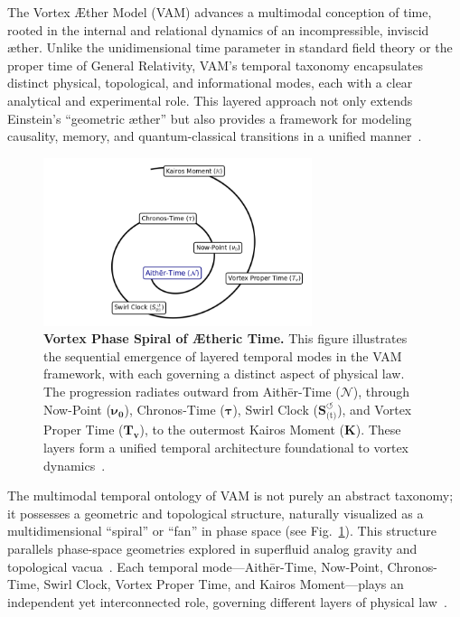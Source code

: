 The Vortex Æther Model (VAM) advances a multimodal conception of time, rooted in the internal and relational dynamics of an incompressible, inviscid æther. Unlike the unidimensional time parameter in standard field theory or the proper time of General Relativity, VAM’s temporal taxonomy encapsulates distinct physical, topological, and informational modes, each with a clear analytical and experimental role. This layered approach not only extends Einstein’s “geometric æther” but also provides a framework for modeling causality, memory, and quantum-classical transitions in a unified manner~\cite{VAM-8, VAM-13, VAM-15}.

\begin{figure}[htb]
    \centering
    \includegraphics[width=0.7\textwidth]{figures/TemporalOntology}
    \caption{
        \textbf{Vortex Phase Spiral of Ætheric Time.} This figure illustrates the sequential emergence of layered temporal modes in the VAM framework, with each governing a distinct aspect of physical law. The progression radiates outward from Aithēr-Time ($\boldsymbol{\mathcal{N}}$), through Now-Point ($\boldsymbol{\nu_0}$), Chronos-Time ($\boldsymbol{\tau}$), Swirl Clock ($\boldsymbol{S}^{\boldsymbol{\circlearrowleft}}_\text{(t)}$), and Vortex Proper Time ($\boldsymbol{T_v}$), to the outermost Kairos Moment ($\mathbb{\boldsymbol{K}}$). These layers form a unified temporal architecture foundational to vortex dynamics~\cite{VAM-8, VAM-13}.
    }

    \label{fig:temporal_ontology}
\end{figure}

The multimodal temporal ontology of VAM is not purely an abstract taxonomy; it possesses a geometric and topological structure, naturally visualized as a multidimensional “spiral” or “fan” in phase space (see Fig.~\ref{fig:temporal_ontology}). This structure parallels phase-space geometries explored in superfluid analog gravity and topological vacua~\cite{volovik2003universe}. Each temporal mode—Aithēr-Time, Now-Point, Chronos-Time, Swirl Clock, Vortex Proper Time, and Kairos Moment—plays an independent yet interconnected role, governing different layers of physical law~\cite{VAM-8, VAM-13}.

